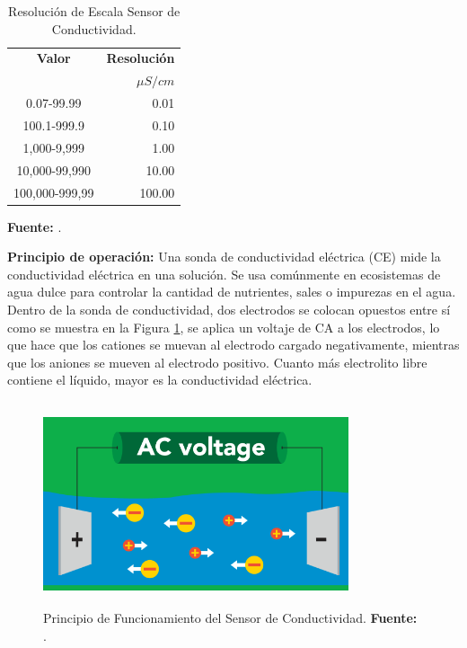 \begin{table}[t]
    
    \protect\caption[Resolución de Escala Sensor de Conductividad]{Resolución de Escala Sensor de Conductividad.}\label{tab:resol_ce}
    \centering
    \begin{tabular}{ c r }
         \toprule
         \textbf{Valor}&\textbf{Resolución} \\
          &  $\mu S/cm$ \\
         \midrule
         0.07-99.99 & 0.01  \\
         100.1-999.9 & 0.10 \\
         1,000-9,999 & 1.00 \\
         10,000-99,990 & 10.00 \\
         100,000-999,99 & 100.00  \\
        \bottomrule
    \end{tabular}
   \vspace{5mm}
   \newline
    \textbf{Fuente: }\cite{ezoce}.
\end{table}

\textbf{Principio de operación: }
Una sonda de conductividad eléctrica (CE) mide la conductividad eléctrica en una solución. Se usa comúnmente en ecosistemas de agua dulce para controlar la cantidad de nutrientes, sales o impurezas en el agua.
Dentro de la sonda de conductividad, dos electrodos se colocan opuestos entre sí como se muestra en la Figura \ref{fig:4.14}, se aplica un voltaje de CA a los electrodos, lo que hace que los cationes se muevan al electrodo cargado negativamente, mientras que los aniones se mueven al electrodo positivo. Cuanto más electrolito libre contiene el líquido, mayor es la conductividad eléctrica.

\begin{figure}[H]
    \centering
    \includegraphics[width=90mm, height=60mm]{Imagenes/2021/imag37.png}
    \caption[Principio de Funcionamiento del Sensor de Conductividad]{Principio de Funcionamiento del Sensor de Conductividad. \textbf{Fuente: }\cite{ezoce}.}
    \label{fig:4.14}
\end{figure}

